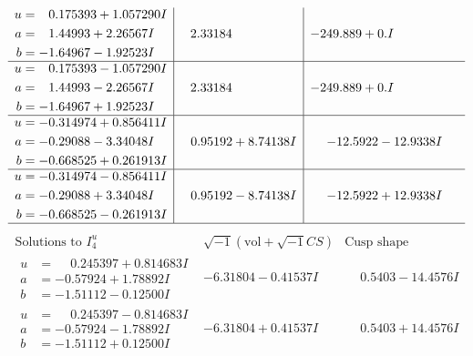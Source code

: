 \documentclass[1p]{elsarticle_modified}
\theoremstyle{definition}
\newcommand{\I}{\sqrt{-1}}
\begin{document}
$$\begin{array}{c|c|c}
\begin{aligned}
u &= \phantom{-}0.175393 + 1.057290 I \\
a &= \phantom{-}1.44993 + 2.26567 I \\
b &= -1.64967 - 1.92523 I\end{aligned}
 & \phantom{-}2.33184\phantom{ +0.000000I} & -249.889 + 0. I\phantom{ +0.000000I} \\ \hline\begin{aligned}
u &= \phantom{-}0.175393 - 1.057290 I \\
a &= \phantom{-}1.44993 - 2.26567 I \\
b &= -1.64967 + 1.92523 I\end{aligned}
 & \phantom{-}2.33184\phantom{ +0.000000I} & -249.889 + 0. I\phantom{ +0.000000I} \\ \hline\begin{aligned}
u &= -0.314974 + 0.856411 I \\
a &= -0.29088 - 3.34048 I \\
b &= -0.668525 + 0.261913 I\end{aligned}
 & \phantom{-}0.95192 + 8.74138 I & -12.5922 - 12.9338 I \\ \hline\begin{aligned}
u &= -0.314974 - 0.856411 I \\
a &= -0.29088 + 3.34048 I \\
b &= -0.668525 - 0.261913 I\end{aligned}
 & \phantom{-}0.95192 - 8.74138 I & -12.5922 + 12.9338 I\\
 \hline 
 \end{array}$$\newpage$$\begin{array}{c|c|c}  
\text{Solutions to }I^u_{4}& \I (\text{vol} + \sqrt{-1}CS) & \text{Cusp shape}\\
 \hline 
\begin{aligned}
u &= \phantom{-}0.245397 + 0.814683 I \\
a &= -0.57924 + 1.78892 I \\
b &= -1.51112 - 0.12500 I\end{aligned}
 & -6.31804 - 0.41537 I & \phantom{-}0.5403 - 14.4576 I \\ \hline\begin{aligned}
u &= \phantom{-}0.245397 - 0.814683 I \\
a &= -0.57924 - 1.78892 I \\
b &= -1.51112 + 0.12500 I\end{aligned}
 & -6.31804 + 0.41537 I & \phantom{-}0.5403 + 14.4576 I \\ \hline\begin{aligned}

\end{aligned}
\end{array}$$
\end{document}
